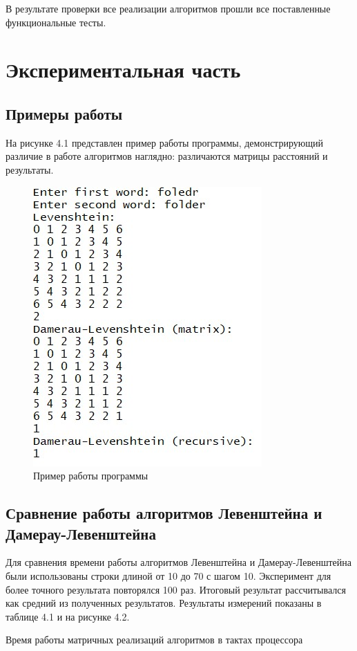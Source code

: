 \documentclass[12pt, a4paper]{report}
\begin{document}
	В результате проверки все реализации алгоритмов прошли все поставленные функциональные тесты.

	\chapter{Экспериментальная часть}
	\section{Примеры работы}
	На рисунке 4.1 представлен пример работы программы, демонстрирующий различие в работе алгоритмов наглядно: различаются матрицы расстояний и результаты.
	\begin{figure}[ht!]
		\centering
		\includegraphics[width=0.5\linewidth]{example.jpg}
		\caption{Пример работы программы}
		\label{fig:example}
	\end{figure}
	
	\section{Сравнение работы алгоритмов Левенштейна и Дамерау-Левенштейна}
	Для сравнения времени работы алгоритмов Левенштейна и Дамерау-Левенштейна были использованы строки длиной от 10 до 70 с шагом 10. Эксперимент для более точного результата повторялся 100 раз. Итоговый результат рассчитывался как средний из полученных результатов. Результаты измерений показаны в таблице 4.1 и на рисунке 4.2.\\
	\begin{table}[ht!]
		\caption{Время работы матричных реализаций алгоритмов в тактах процессора}
		\begin{center}
		\end{center}
	\end{table}
	
\end{document}
